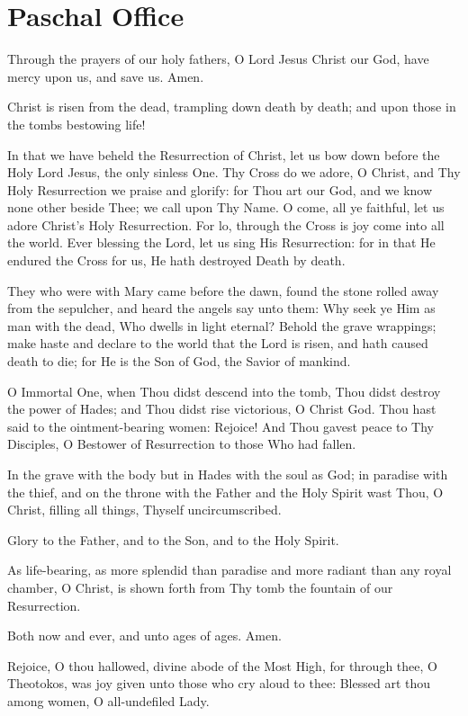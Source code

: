 \section{Paschal Office}

Through the prayers of our holy fathers, O Lord Jesus Christ our God, have mercy upon us, and save us. Amen.

Christ is risen from the dead, trampling down death by death; and upon those in the tombs bestowing life! 

In that we have beheld the Resurrection of Christ, let us bow down before the Holy Lord Jesus, the only sinless One. Thy Cross do we adore, O Christ, and Thy Holy Resurrection we praise and glorify: for Thou art our God, and we know none other beside Thee; we call upon Thy Name. O come, all ye faithful, let us adore Christ's Holy Resurrection. For lo, through the Cross is joy come into all the world. Ever blessing the Lord, let us sing His Resurrection: for in that He endured the Cross for us, He hath destroyed Death by death. 

 They who were with Mary came before the dawn, found the stone rolled away from the sepulcher, and heard the angels say unto them: Why seek ye Him as man with the dead, Who dwells in light eternal? Behold the grave wrappings; make haste and declare to the world that the Lord is risen, and hath caused death to die; for He is the Son of God, the Savior of mankind.

 O Immortal One, when Thou didst descend into the tomb, Thou didst destroy the power of Hades; and Thou didst rise victorious, O Christ God. Thou hast said to the ointment-bearing women: Rejoice! And Thou gavest peace to Thy Disciples, O Bestower of Resurrection to those Who had fallen.

In the grave with the body but in Hades with the soul as God; in paradise with the thief, and on the throne with the Father and the Holy Spirit wast Thou, O Christ, filling all things, Thyself uncircumscribed.

Glory to the Father, and to the Son, and to the Holy Spirit.

As life-bearing, as more splendid than paradise and more radiant than any royal chamber, O Christ, is shown forth from Thy tomb the fountain of our Resurrection.

Both now and ever, and unto ages of ages. Amen.

Rejoice, O thou hallowed, divine abode of the Most High, for through thee, O Theotokos, was joy given unto those who cry aloud to thee: Blessed art thou among women, O all-undefiled Lady.

